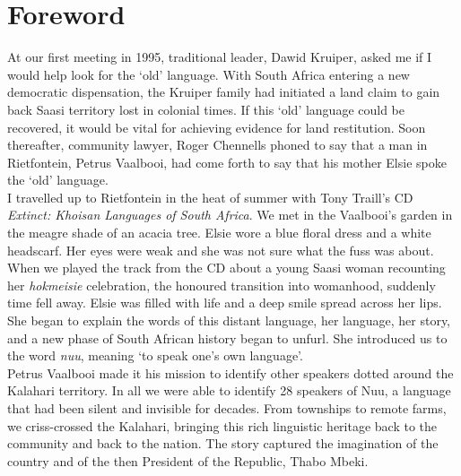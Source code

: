 
\markboth{}{}
\addtocounter{section}{-1}
\tocless\section{Foreword}
{}
\markboth{}{}

At our first meeting in 1995, traditional leader, Dawid Kruiper, asked
me if I would help look for the `old' language. With South Africa
entering a new democratic dispensation, the Kruiper family had
initiated a land claim to gain back Saasi territory lost in colonial
times. If this `old' language could be recovered, it would be vital
for achieving evidence for land restitution. Soon thereafter,
community lawyer, Roger Chennells phoned to say that a man in
Rietfontein, Petrus Vaalbooi, had come forth to say that his mother
Elsie spoke the `old' language.\\

I travelled up to Rietfontein in the heat of summer with Tony Traill's
CD \emph{Extinct: Khoisan Languages of South Africa}. We met in the
Vaalbooi's garden in the meagre shade of an acacia tree. Elsie wore a
blue floral dress and a white headscarf. Her eyes were weak and she
was not sure what the fuss was about. When we played the track from
the CD about a young Saasi woman recounting her \emph{hokmeisie}
celebration, the honoured transition into womanhood, suddenly time
fell away. Elsie was filled with life and a deep smile spread across
her lips. She began to explain the words of this distant language, her
language, her story, and a new phase of South African history began to
unfurl. She introduced us to the word
\emph{n\textipa{\textvertline}uu}, meaning `to speak one's own
language'.\\

Petrus Vaalbooi made it his mission to identify other speakers dotted
around the Kalahari territory. In all we were able to identify 28
speakers of N\textipa{\textvertline}uu, a language that had been
silent and invisible for decades. From townships to remote farms, we
criss-crossed the Kalahari, bringing this rich linguistic heritage
back to the community and back to the nation. The story captured the
imagination of the country and of the then President of the Republic,
Thabo Mbeki.\\

